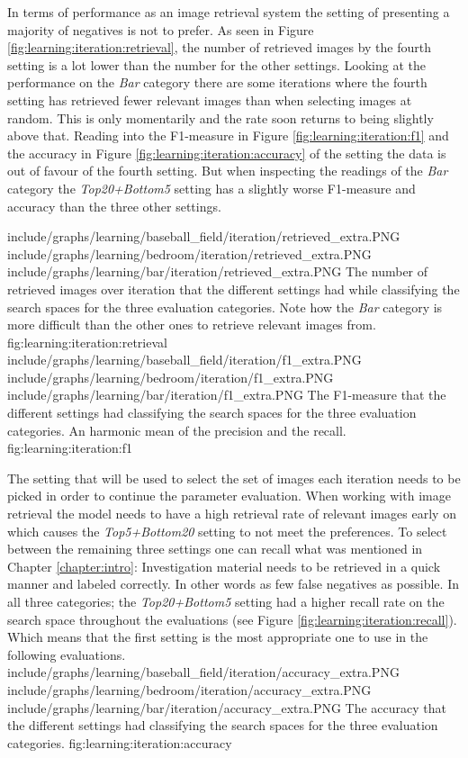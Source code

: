 In terms of performance as an image retrieval system the setting of presenting a majority of negatives is not to prefer. As seen in Figure \ref{fig:learning:iteration:retrieval}, the number of retrieved images by the fourth setting is a lot lower than the number for the other settings. Looking at the performance on the \emph{Bar} category there are some iterations where the fourth setting has retrieved fewer relevant images than when selecting images at random. This is only momentarily and the rate soon returns to being slightly above that. Reading into the F1-measure in Figure \ref{fig:learning:iteration:f1} and the accuracy in Figure \ref{fig:learning:iteration:accuracy} of the setting the data is out of favour of the fourth setting. But when inspecting the readings of the \emph{Bar} category the \emph{Top20+Bottom5} setting has a slightly worse F1-measure and accuracy than the three other settings. 

\tripfigurenear
{include/graphs/learning/baseball_field/iteration/retrieved_extra.PNG}
{include/graphs/learning/bedroom/iteration/retrieved_extra.PNG}
{include/graphs/learning/bar/iteration/retrieved_extra.PNG}
{The number of retrieved images over iteration that the different settings had while classifying the search spaces for the three evaluation categories. Note how the \emph{Bar} category is more difficult than the other ones to retrieve relevant images from.}
{fig:learning:iteration:retrieval}
\tripfigurenear
{include/graphs/learning/baseball_field/iteration/f1_extra.PNG}
{include/graphs/learning/bedroom/iteration/f1_extra.PNG}
{include/graphs/learning/bar/iteration/f1_extra.PNG}
{The F1-measure that the different settings had classifying the search spaces for the three evaluation categories. An harmonic mean of the precision and the recall.}
{fig:learning:iteration:f1}


The setting that will be used to select the set of images each iteration needs to be picked in order to continue the parameter evaluation. When working with image retrieval the model needs to have a high retrieval rate of relevant images early on which causes the \emph{Top5+Bottom20} setting to not meet the preferences. To select between the remaining three settings one can recall what was mentioned in Chapter \ref{chapter:intro}: Investigation material needs to be retrieved in a quick manner and labeled correctly. In other words as few false negatives as possible. In all three categories; the \emph{Top20+Bottom5} setting had a higher recall rate on the search space throughout the evaluations (see Figure \ref{fig:learning:iteration:recall}). Which means that the first setting is the most appropriate one to use in the following evaluations. 
\tripfigure
{include/graphs/learning/baseball_field/iteration/accuracy_extra.PNG}
{include/graphs/learning/bedroom/iteration/accuracy_extra.PNG}
{include/graphs/learning/bar/iteration/accuracy_extra.PNG}
{The accuracy that the different settings had classifying the search spaces for the three evaluation categories.}
{fig:learning:iteration:accuracy}
